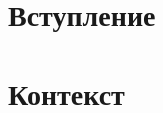 \documentclass[a4paper, 12pt]{article}
\begin{document}
	
	\newpage
	\tableofcontents
	\newpage
	\section{Вступление}
	
	\section{Контекст}
	
	
	
	
	\newpage
	
\end{document}
